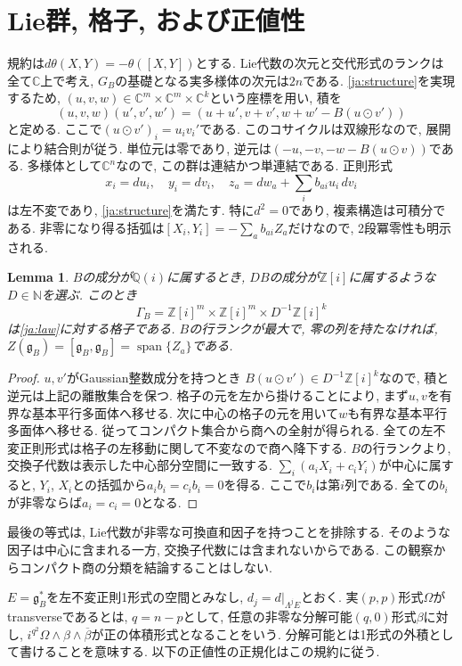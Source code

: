 \documentclass[12pt]{amsart}
\newcommand{\lemword}{Lemma}
\newtheorem{lem}[thm]{\lemword}
\theoremstyle{definition}
\theoremstyle{remark}
\numberwithin{equation}{section}
\newcommand{\Z}{\mathbb{Z}}
\newcommand{\N}{\mathbb{N}}
\newcommand{\C}{\mathbb{C}}
\newcommand{\Q}{\mathbb{Q}}
\begin{document}
\section{Lie群, 格子, および正値性}\label{ja:groups}
規約は$d\theta(X,Y)=-\theta([X,Y])$とする.
Lie代数の次元と交代形式のランクは全て$\C$上で考え,
$G_B$の基礎となる実多様体の次元は$2n$である.
\eqref{ja:structure}を実現するため,
$(u,v,w)\in\C^m\times\C^m\times\C^k$という座標を用い, 積を
\begin{equation}\label{ja:law}
 (u,v,w)(u',v',w')
 =\left(u+u',v+v',w+w'-B(u\odot v')\right)
\end{equation}
と定める. ここで$(u\odot v')_i=u_i v_i'$である.
このコサイクルは双線形なので, 展開により結合則が従う.
単位元は零であり, 逆元は$(-u,-v,-w-B(u\odot v))$である.
多様体として$\C^n$なので, この群は連結かつ単連結である.
正則形式
\[
 x_i=du_i,\quad y_i=dv_i,\quad
 z_a=dw_a+\sum_i b_{ai}u_i\,dv_i
\]
は左不変であり, \eqref{ja:structure}を満たす.
特に$d^2=0$であり, 複素構造は可積分である.
非零になり得る括弧は$[X_i,Y_i]=-\sum_a b_{ai}Z_a$だけなので,
2段冪零性も明示される.

\begin{lem}\label{ja:lattice}
$B$の成分が$\Q(i)$に属するとき, $DB$の成分が$\Z[i]$に属するような
$D\in\N$を選ぶ. このとき
\[
 \Gamma_B=\Z[i]^m\times\Z[i]^m\times D^{-1}\Z[i]^k
\]
は\eqref{ja:law}に対する格子である.
$B$の行ランクが最大で, 零の列を持たなければ,
$Z(\mathfrak g_B)=[\mathfrak g_B,\mathfrak g_B]
=\operatorname{span}\{Z_a\}$である.
\end{lem}
\begin{proof}
$u,v'$がGaussian整数成分を持つとき
$B(u\odot v')\in D^{-1}\Z[i]^k$なので,
積と逆元は上記の離散集合を保つ.
格子の元を左から掛けることにより, まず$u,v$を有界な基本平行多面体へ移せる.
次に中心の格子の元を用いて$w$も有界な基本平行多面体へ移せる.
従ってコンパクト集合から商への全射が得られる.
全ての左不変正則形式は格子の左移動に関して不変なので商へ降下する.
$B$の行ランクより, 交換子代数は表示した中心部分空間に一致する.
$\sum_i(a_iX_i+c_iY_i)$が中心に属すると,
$Y_i$, $X_i$との括弧から$a_i b_i=c_i b_i=0$を得る.
ここで$b_i$は第$i$列である. 全ての$b_i$が非零ならば$a_i=c_i=0$となる.
\end{proof}

最後の等式は, Lie代数が非零な可換直和因子を持つことを排除する.
そのような因子は中心に含まれる一方, 交換子代数には含まれないからである.
この観察からコンパクト商の分類を結論することはしない.

$E=\mathfrak g_B^*$を左不変正則1形式の空間とみなし,
$d_j=d|_{\Lambda^j E}$とおく.
実$(p,p)$形式$\Omega$がtransverseであるとは, $q=n-p$として,
任意の非零な分解可能$(q,0)$形式$\beta$に対し,
$i^{q^2}\Omega\wedge\beta\wedge\overline\beta$が正の体積形式となることをいう.
分解可能とは1形式の外積として書けることを意味する.
以下の正値性の正規化はこの規約に従う.
\end{document}
